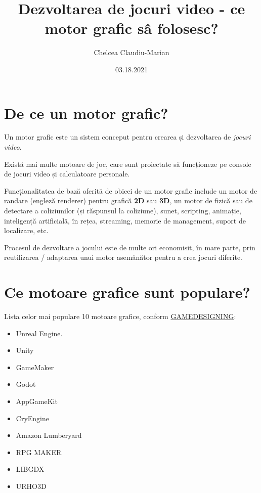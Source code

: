 \documentclass[12pt]{article}
\author{Chelcea Claudiu-Marian}
\title{Dezvoltarea de jocuri video - ce motor grafic s\^{a} folosesc?}
\date{03.18.2021}
\begin{document}
\maketitle

\newpage
\tableofcontents

\newpage
\section{De ce un motor grafic?}
\hspace{10pt}
Un motor grafic este un sistem conceput pentru crearea și dezvoltarea de {\it jocuri video}. \par Există mai multe motoare de joc, care sunt proiectate să funcționeze pe console de jocuri video și calculatoare personale. \par Funcționalitatea de bază oferită de obicei de un motor grafic include un motor de randare (engleză renderer) pentru grafică {\bf 2D} sau {\bf 3D}, un motor de fizică sau de detectare a coliziunilor (și răspunsul la coliziune), sunet, scripting, animație, inteligență artificială, în rețea, streaming, memorie de management, suport de localizare, etc. \par Procesul de dezvoltare a jocului este de multe ori economisit, în mare parte, prin reutilizarea / adaptarea unui motor asemănător pentru a crea jocuri diferite.

\newpage
\section{Ce motoare grafice sunt populare?}
\hspace{5pt} Lista celor mai populare 10 motoare grafice, conform \href{https://www.gamedesigning.org/career/video-game-engines/}{GAMEDESIGNING}:
\begin{itemize}
  \item Unreal Engine.
  \item Unity
  \item GameMaker
  \item Godot
  \item AppGameKit
  \item CryEngine
  \item Amazon Lumberyard
  \item RPG MAKER
  \item LIBGDX
  \item URHO3D
\end{itemize}
\end{document}
